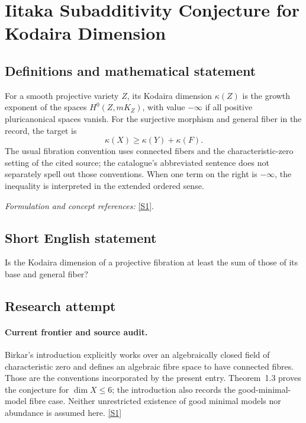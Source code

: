 \documentclass[11pt,a4paper]{article}
\newcommand{\sref}[2]{\hyperlink{source:#1:#2}{[S#2]}}
\newif\ifshowcatalogue
\newcommand{\cataloguescope}[1]{\ifshowcatalogue
 \paragraph{Exact scope in the supplied catalogue.}
 \begin{quote}\small #1\end{quote}\fi}
\numberwithin{equation}{section}
\begin{document}
\setcounter{section}{0}
\clearpage
\section*{\texorpdfstring{Iitaka Subadditivity Conjecture for Kodaira Dimension}{Iitaka Subadditivity Conjecture for Kodaira Dimension}}\label{30005168}
\subsection{Definitions and mathematical statement}
For a smooth projective variety $Z$, its Kodaira dimension $\kappa(Z)$ is the growth exponent of the spaces $H^0(Z,mK_Z)$, with value $-\infty$ if all positive pluricanonical spaces vanish. For the surjective morphism and general fiber in the record, the target is
\[
 \kappa(X)\ge\kappa(Y)+\kappa(F).
\]
The usual fibration convention uses connected fibers and the characteristic-zero setting of the cited source; the catalogue's abbreviated sentence does not separately spell out those conventions. When one term on the right is $-\infty$, the inequality is interpreted in the extended ordered sense.
\par\smallskip\textit{Formulation and concept references:} \sref{30005168}{1}.
\cataloguescope{Prove the Iitaka conjecture C\_\{n,m\}: for a surjective morphism f: X -> Y between smooth projective varieties with general fibre F, kappa(X) >= kappa(Y) + kappa(F).}
\subsection{Short English statement}
Is the Kodaira dimension of a projective fibration at least the sum of those of its base and general fiber?
\subsection{Research attempt}

\paragraph{Current frontier and source audit.}
Birkar's introduction explicitly works over an algebraically closed field
of characteristic zero and defines an algebraic fibre space to have
connected fibres. Those are the conventions incorporated by the present
entry. Theorem~1.3 proves the conjecture for $\dim X\leq6$; the introduction
also records the good-minimal-model fibre case. Neither unrestricted
existence of good minimal models nor abundance is assumed here.
\sref{30005168}{1}
\end{document}
